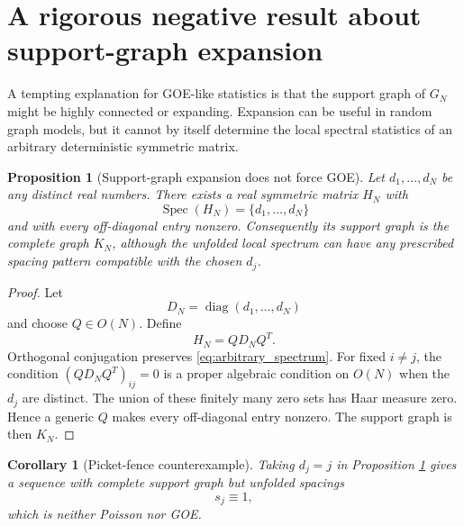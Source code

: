 \documentclass[11pt]{amsart}
\numberwithin{equation}{section}
\theoremstyle{plain}
\newtheorem{proposition}[theorem]{Proposition}
\newtheorem{corollary}[theorem]{Corollary}
\theoremstyle{definition}
\theoremstyle{remark}
\newcommand{\Spec}{\operatorname{Spec}}
\newcommand{\diag}{\operatorname{diag}}
\begin{document}
\section{A rigorous negative result about support-graph expansion}
\label{sec:negative_expansion_result}

A tempting explanation for GOE-like statistics is that the support graph of $G_N$ might be highly connected or expanding.  Expansion can be useful in random graph models, but it cannot by itself determine the local spectral statistics of an arbitrary deterministic symmetric matrix.

\begin{proposition}[Support-graph expansion does not force GOE]
\label{prop:expansion_not_sufficient}
Let $d_1,\ldots,d_N$ be any distinct real numbers.  There exists a real symmetric matrix $H_N$ with
\begin{equation}
\Spec(H_N)=\{d_1,\ldots,d_N\}
\label{eq:arbitrary_spectrum}
\end{equation}
and with every off-diagonal entry nonzero.  Consequently its support graph is the complete graph $K_N$, although the unfolded local spectrum can have any prescribed spacing pattern compatible with the chosen $d_j$.
\end{proposition}

\begin{proof}
Let
\begin{equation}
D_N=\diag(d_1,\ldots,d_N)
\label{eq:diagonal_prescribed_spectrum}
\end{equation}
and choose $Q\in O(N)$.  Define
\begin{equation}
H_N=QD_NQ^T.
\label{eq:orthogonal_conjugate}
\end{equation}
Orthogonal conjugation preserves \eqref{eq:arbitrary_spectrum}.  For fixed $i\ne j$, the condition $(QD_NQ^T)_{ij}=0$ is a proper algebraic condition on $O(N)$ when the $d_j$ are distinct.  The union of these finitely many zero sets has Haar measure zero.  Hence a generic $Q$ makes every off-diagonal entry nonzero.  The support graph is then $K_N$.
\end{proof}

\begin{corollary}[Picket-fence counterexample]
\label{cor:picket_fence}
Taking $d_j=j$ in Proposition \ref{prop:expansion_not_sufficient} gives a sequence with complete support graph but unfolded spacings
\begin{equation}
s_j\equiv1,
\label{eq:picket_fence_spacing}
\end{equation}
which is neither Poisson nor GOE.
\end{corollary}
\end{document}

